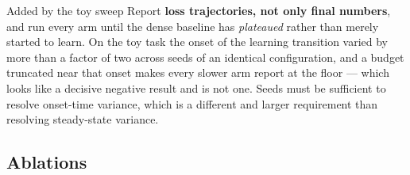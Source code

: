 \begin{revision}{Added by the toy sweep}
Report \textbf{loss trajectories, not only final numbers}, and run every arm until the dense baseline has \emph{plateaued} rather than merely started to learn. On the toy task the onset of the learning transition varied by more than a factor of two across seeds of an identical configuration, and a budget truncated near that onset makes every slower arm report at the floor --- which looks like a decisive negative result and is not one. Seeds must be sufficient to resolve onset-time variance, which is a different and larger requirement than resolving steady-state variance.
\end{revision}

\subsection{Ablations}

